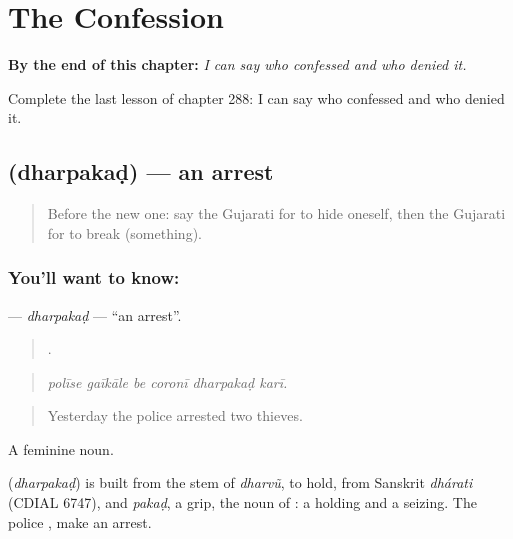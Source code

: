 
\chapter{The Confession}
\label{ch:gu-the-confession}

\begin{chapteropening}
\textbf{By the end of this chapter:} \emph{I can say who confessed and who denied it.}

Complete the last lesson of chapter 288: I can say who confessed and who denied it.
\end{chapteropening}

\section[\texorpdfstring{\gu{ધરપકડ} (dharpakaḍ)}{ધરપકડ (dharpakaḍ)}]{ (dharpakaḍ) — an arrest}

\label{lesson:GU-C288-dharpakad}



\begin{quote}
Before the new one: say the Gujarati for to hide oneself, then the Gujarati for to break (something).
\end{quote}

\subsection*{You'll want to know: }
\textbf{} — \emph{dharpakaḍ} — \textquotedblleft{}an arrest\textquotedblright{}.

\begin{quote}
     .
\end{quote}

\begin{quote}
\emph{polīse gaīkāle be coronī dharpakaḍ karī.}
\end{quote}

\begin{quote}
Yesterday the police arrested two thieves.
\end{quote}

A feminine noun.

\begin{cousinweb}
\textbf{} (\emph{dharpakaḍ}) is built from the stem of \emph{dharvũ}, to hold, from Sanskrit \emph{dhárati} (CDIAL 6747), and \emph{pakaḍ}, a grip, the noun of \textbf{}: a holding and a seizing. The police \textbf{  }, make an arrest.
\end{cousinweb}


